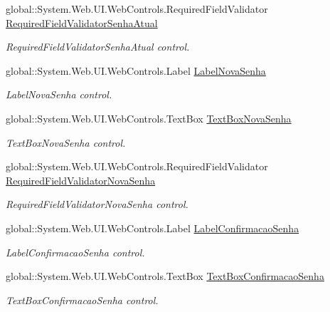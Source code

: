 \begin{DoxyCompactItemize}
global::System.Web.UI.WebControls.RequiredFieldValidator \hyperlink{class_sistema_r_h_1_1_altera_senha_a05589ac127845071145e824c72804f46}{RequiredFieldValidatorSenhaAtual}
\begin{DoxyCompactList}\small\item\em RequiredFieldValidatorSenhaAtual control. \item\end{DoxyCompactList}\item 
global::System.Web.UI.WebControls.Label \hyperlink{class_sistema_r_h_1_1_altera_senha_aaf58ce95cd22dfdadb96b4f62240e9ee}{LabelNovaSenha}
\begin{DoxyCompactList}\small\item\em LabelNovaSenha control. \item\end{DoxyCompactList}\item 
global::System.Web.UI.WebControls.TextBox \hyperlink{class_sistema_r_h_1_1_altera_senha_a9f931ca7c9b7bb9fd7baf90628f50322}{TextBoxNovaSenha}
\begin{DoxyCompactList}\small\item\em TextBoxNovaSenha control. \item\end{DoxyCompactList}\item 
global::System.Web.UI.WebControls.RequiredFieldValidator \hyperlink{class_sistema_r_h_1_1_altera_senha_a5548e2085fb497f82d03bf8587545cfe}{RequiredFieldValidatorNovaSenha}
\begin{DoxyCompactList}\small\item\em RequiredFieldValidatorNovaSenha control. \item\end{DoxyCompactList}\item 
global::System.Web.UI.WebControls.Label \hyperlink{class_sistema_r_h_1_1_altera_senha_a5097f0b511e0f48d077f39ad3edce159}{LabelConfirmacaoSenha}
\begin{DoxyCompactList}\small\item\em LabelConfirmacaoSenha control. \item\end{DoxyCompactList}\item 
global::System.Web.UI.WebControls.TextBox \hyperlink{class_sistema_r_h_1_1_altera_senha_a0379f111e5829bed2523256699689fba}{TextBoxConfirmacaoSenha}
\begin{DoxyCompactList}\small\item\em TextBoxConfirmacaoSenha control. \item\end{DoxyCompactList}\item 

\end{DoxyCompactItemize}
